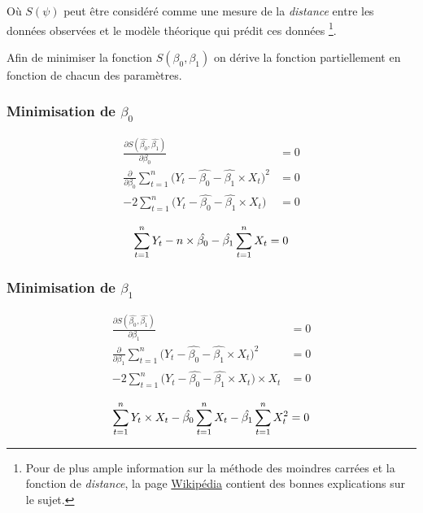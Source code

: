 \documentclass[11pt,french]{report}
\begin{document}
Où $S(\psi)$ peut être considéré comme une mesure de la \emph{distance} entre les données observées et le modèle théorique qui prédit ces données \footnote{Pour de plus ample information sur la méthode des moindres carrées et la fonction de \emph{distance}, la page \href{https://fr.wikipedia.org/wiki/Méthode_des_moindres_carrés}{Wikipédia} contient des bonnes explications sur le sujet.}.

\bigskip
Afin de minimiser la fonction $S(\beta_0, \beta_1)$ on dérive la fonction partiellement en fonction de chacun des paramètres.

\subsubsection*{Minimisation de $\beta_0$}
\begin{align*}
\frac{\partial S(\hat{\beta_0}, \hat{\beta_1})}{\partial \beta_0} &= 0 \\
\frac{\partial}{\partial \beta_0} \sum_{t=1}^n \big( Y_t - \hat{\beta_0} - \hat{\beta_1}\times X_t \big)^2 &= 0 \\
-2\sum_{t=1}^n \big( Y_t - \hat{\beta_0} - \hat{\beta_1} \times X_t \big) &= 0 \\
\end{align*}
\begin{equation}
\label{eq:minimisationbeta0}
\sum_{t=1}^n Y_t - n \times \hat{\beta_0} - \hat{\beta_1} \sum_{t=1}^n X_t = 0 \\
\end{equation}

\subsubsection*{Minimisation de $\beta_1$}
\begin{align*}
\frac{\partial S(\hat{\beta_0}, \hat{\beta_1})}{\partial \beta_1} &= 0 \\
\frac{\partial}{\partial \beta_1} \sum_{t=1}^n \big( Y_t - \hat{\beta_0} - \hat{\beta_1}\times X_t \big)^2 &= 0 \\
-2\sum_{t=1}^n \big( Y_t - \hat{\beta_0} - \hat{\beta_1} \times X_t \big) \times X_t &= 0 \\
\end{align*}
\begin{equation}
\label{eq:minimisationbeta1}
\sum_{t=1}^n Y_t \times X_t - \hat{\beta_0} \sum_{t=1}^n X_t - \hat{\beta_1} \sum_{t=1}^n X_t^2 = 0 \\
\end{equation}
\end{document}
